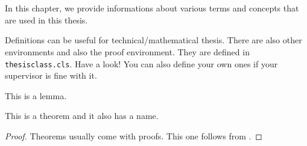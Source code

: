 \chapter{\background}
\label{ch:background}
In this chapter,  we provide informations about various terms and concepts that are used in this thesis.
\begin{definition}
Definitions can be useful for technical/mathematical thesis. There are also other environments and also the proof environment. They are defined in \texttt{thesisclass.cls}. Have a look! You can also define your own ones if your supervisor is fine with it.
\end{definition}

\begin{lemma}\label{lem:just_a_lemma}
This is a lemma.
\end{lemma}

\begin{theorem}
    This is a theorem and it also has a name.
\end{theorem}
\begin{proof}
    Theorems usually come with proofs.
    This one follows from .
\end{proof}

